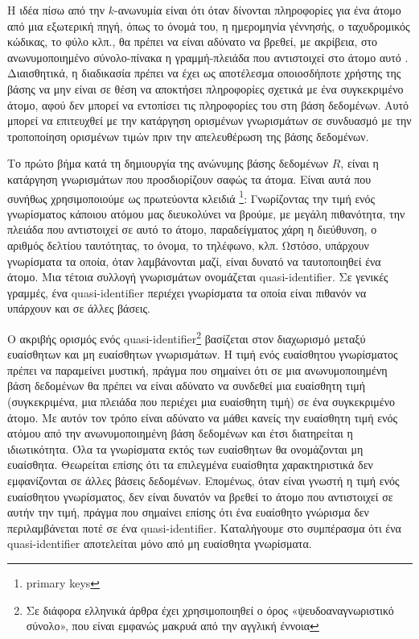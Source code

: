 Η ιδέα πίσω από την $k$-ανωνυμία είναι ότι όταν δίνονται πληροφορίες για ένα άτομο από μια εξωτερική πηγή, όπως το όνομά του, η ημερομηνία γέννησής, ο ταχυδρομικός κώδικας, το φύλο κλπ., θα πρέπει να είναι αδύνατο να βρεθεί, με ακρίβεια, στο ανωνυμοποιημένο σύνολο-πίνακα η γραμμή-πλειάδα που αντιστοιχεί στο άτομο αυτό \textlatin{\cite{k}}. Διαισθητικά, η διαδικασία πρέπει να έχει ως αποτέλεσμα οποιοσδήποτε χρήστης της βάσης να μην είναι σε θέση να αποκτήσει πληροφορίες σχετικά με ένα συγκεκριμένο άτομο, αφού δεν μπορεί να εντοπίσει τις πληροφορίες του στη βάση δεδομένων. Αυτό μπορεί να επιτευχθεί με την κατάργηση ορισμένων γνωρισμάτων σε συνδυασμό με την τροποποίηση ορισμένων τιμών πριν την απελευθέρωση της βάσης δεδομένων.

Το πρώτο βήμα κατά τη δημιουργία της ανώνυμης βάσης δεδομένων $R$, είναι η κατάργηση γνωρισμάτων που προσδιορίζουν σαφώς τα άτομα. Είναι αυτά που συνήθως χρησιμοποιούμε ως πρωτεύοντα κλειδιά \footnote{\textlatin{primary keys}}: Γνωρίζοντας την τιμή ενός γνωρίσματος κάποιου ατόμου μας διευκολύνει να βρούμε, με μεγάλη πιθανότητα, την πλειάδα που αντιστοιχεί σε αυτό το άτομο, παραδείγματος χάρη η διεύθυνση, ο αριθμός δελτίου ταυτότητας, το όνομα, το τηλέφωνο, κλπ. Ωστόσο, υπάρχουν γνωρίσματα τα οποία, όταν λαμβάνονται μαζί, είναι δυνατό να ταυτοποιηθεί ένα άτομο. Μια τέτοια συλλογή γνωρισμάτων ονομάζεται \textlatin{quasi-identifier}. Σε γενικές γραμμές, ένα \textlatin{quasi-identifier} περιέχει γνωρίσματα τα οποία είναι πιθανόν να υπάρχουν και σε άλλες βάσεις.

Ο ακριβής ορισμός ενός \textlatin{quasi-identifier}\footnote{Σε διάφορα ελληνικά άρθρα έχει χρησιμοποιηθεί ο όρος «ψευδοαναγνωριστικό σύνολο», που είναι εμφανώς μακρυά από την αγγλική έννοια} βασίζεται στον διαχωρισμό μεταξύ ευαίσθητων και μη ευαίσθητων γνωρισμάτων. Η τιμή ενός ευαίσθητου γνωρίσματος πρέπει να παραμείνει μυστική, πράγμα που σημαίνει ότι σε μια ανωνυμοποιημένη βάση δεδομένων θα πρέπει να είναι αδύνατο να συνδεθεί μια ευαίσθητη τιμή (συγκεκριμένα, μια πλειάδα που περιέχει μια ευαίσθητη τιμή) σε ένα συγκεκριμένο άτομο. Με αυτόν τον τρόπο είναι αδύνατο να μάθει κανείς την ευαίσθητη τιμή ενός ατόμου από την ανωνυμοποιημένη βάση δεδομένων και έτσι διατηρείται η ιδιωτικότητα. Όλα τα γνωρίσματα εκτός των ευαίσθητων θα ονομάζονται μη ευαίσθητα. Θεωρείται επίσης ότι τα επιλεγμένα ευαίσθητα χαρακτηριστικά δεν εμφανίζονται σε άλλες βάσεις δεδομένων. Επομένως, όταν είναι γνωστή η τιμή ενός ευαίσθητου γνωρίσματος, δεν είναι δυνατόν να βρεθεί το άτομο που αντιστοιχεί σε αυτήν την τιμή, πράγμα που σημαίνει επίσης ότι ένα ευαίσθητο γνώρισμα δεν περιλαμβάνεται ποτέ σε ένα \textlatin{quasi-identifier}. Καταλήγουμε στο συμπέρασμα ότι ένα \textlatin{quasi-identifier} αποτελείται μόνο από μη ευαίσθητα γνωρίσματα.

